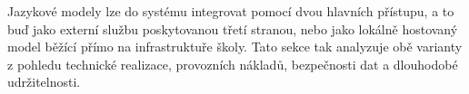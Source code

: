 Jazykové modely lze do systému integrovat pomocí dvou hlavních přístupu, a to buď jako externí službu poskytovanou třetí stranou, nebo jako lokálně hostovaný model běžící přímo na infrastruktuře školy.
Tato sekce tak analyzuje obě varianty z pohledu technické realizace, provozních nákladů, bezpečnosti dat a dlouhodobé udržitelnosti.




\endinput